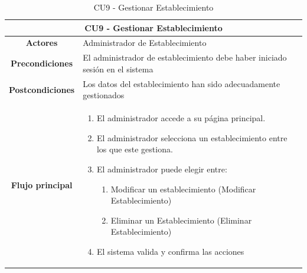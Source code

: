 \begin{table}[h]
    \centering
    \begin{tabular}{|c|p{10cm}|}
        \hline
        \multicolumn{2}{|c|}{\textbf{CU9 - Gestionar Establecimiento}}                                              \\
        \hline
        \textbf{Actores}         & Administrador de Establecimiento                                                 \\
        \hline
        \textbf{Precondiciones}  & El administrador de establecimiento debe haber iniciado sesión en el sistema     \\
        \hline
        \textbf{Postcondiciones} & Los datos del establecimiento han sido adecuadamente gestionados                 \\
        \hline
        \textbf{Flujo principal} & \begin{enumerate}
                                       \item El administrador accede a su página principal.
                                       \item El administrador selecciona un establecimiento entre los que este gestiona.
                                       \item El administrador puede elegir entre:
                                             \begin{enumerate}
                      \item Modificar un establecimiento (Modificar Establecimiento)
                      \item Eliminar un Establecimiento (Eliminar Establecimiento)
                  \end{enumerate}
                                       \item El sistema valida y confirma las acciones
                                   \end{enumerate} \\
        \hline
    \end{tabular}
    \caption{CU9 - Gestionar Establecimiento }
\end{table}

